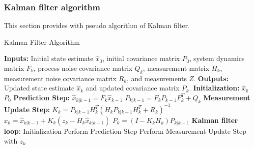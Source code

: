         \subsubsection{Kalman filter algorithm}
This section provides with pseudo algorithm of Kalman filter.
\begin{algorithm}
    \caption{Kalman Filter Algorithm}
    \begin{algorithmic}[1]
        \State \textbf{Inputs:} Initial state estimate $\hat{x}_0$, initial covariance matrix $P_0$, system
        dynamics matrix $F_k$, process noise covariance matrix $Q_k$, measurement matrix $H_k$, measurement noise
        covariance matrix $R_k$, and measurements $Z$.
        \State \textbf{Outputs:} Updated state estimate $\hat{x}_k$ and updated covariance matrix $P_k$.
        \State
        \State \textbf{Initialization:}
        \State $\hat{x}_0$  
        \State $P_0$ 
        \State
        \State \textbf{Prediction Step:}
        \State $\hat{x}_{k|k-1} = F_k \hat{x}_{k-1} $ 
        \State $P_{k|k-1} = F_k P_{k-1} F_k^T + Q_k$ 
        \State
        \State \textbf{Measurement Update Step:}
        \State $K_k = P_{k|k-1} H_k^T (H_k P_{k|k-1} H_k^T + R_k)^{-1}$ 
        \State $\hat{x}_k = \hat{x}_{k|k-1} + K_k(z_k - H_k \hat{x}_{k|k-1})$ 
        \State $P_k = (I - K_k H_k) P_{k|k-1}$ 
        \State
        \State \textbf{Kalman filter loop:}
        \State Initialization
        \State Perform Prediction Step
        \State Perform Measurement Update Step with $z_k$
        \EndFor
    \end{algorithmic}
\end{algorithm}